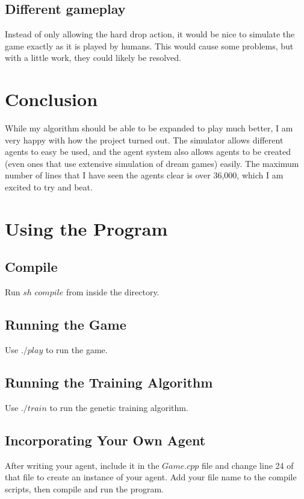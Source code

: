 \documentclass{article}
\begin{document}
\subsection{Different gameplay}
Instead of only allowing the hard drop action, it would be nice to simulate the game exactly as it is played by humans. This would cause some problems, but with a little work, they could likely be resolved.

\section{Conclusion}
While my algorithm should be able to be expanded to play much better, I am very happy with how the project turned out. The simulator allows different agents to easy be used, and the agent system also allows agents to be created (even ones that use extensive simulation of dream games) easily. The maximum number of lines that I have seen the agents clear is over 36,000, which I am excited to try and beat.

\clearpage

\section{Using the Program}
\subsection{Compile}
Run $sh$ $compile$ from inside the directory.
\subsection{Running the Game}
Use $./play$ to run the game.
\subsection{Running the Training Algorithm}
Use $./train$ to run the genetic training algorithm.
\subsection{Incorporating Your Own Agent}
After writing your agent, include it in the $Game.cpp$ file and change line 24 of that file to create an instance of your agent. Add your file name to the compile scripts, then compile and run the program.
\clearpage
\end{document}
